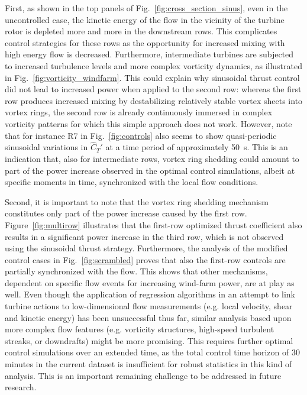 \documentclass[wes, manuscript]{copernicus}
\begin{document}
First, as shown in the top panels of Fig.~\ref{fig:cross_section_sinus}, even in the uncontrolled case, the kinetic energy of the flow in the vicinity of the turbine rotor is depleted more and more in the downstream rows. This complicates control strategies for these rows as the opportunity for increased mixing with high energy flow is decreased. Furthermore, intermediate turbines are subjected to increased turbulence levels and more complex vorticity dynamics, as illustrated in Fig.~\ref{fig:vorticity_windfarm}. This could explain why sinusoidal thrust control did not lead to increased power when applied to the second row: whereas the first row produces increased mixing by destabilizing relatively stable vortex sheets into vortex rings, the second row is already continuously immersed in complex vorticity patterns for which this simple approach does not work. 
However, note that for instance R7 in Fig.~\ref{fig:controls} also seems to show quasi-periodic sinusoidal variations in $\widehat{C}_{T}'$ at a time period of approximately 50~s. This is an indication that, also for intermediate rows, vortex ring shedding could amount to part of the power increase observed in the optimal control simulations, albeit at specific moments in time, synchronized with the local flow conditions.

Second, it is important to note that the vortex ring shedding mechanism constitutes only part of the power increase caused by the first row. Figure~\ref{fig:multirow} illustrates that the first-row optimized thrust coefficient also results in a significant power increase in the third row, which is not observed using the sinusoidal thrust strategy. Furthermore, the analysis of the modified control cases in Fig.~\ref{fig:scrambled} proves that also the first-row controls are partially synchronized with the flow. This shows that other mechanisms, dependent on specific flow events for increasing wind-farm power, are at play as well. Even though the application of regression algorithms in an attempt to link turbine actions to low-dimensional flow measurements (e.g. local velocity, shear and kinetic energy) has been unsuccessful thus far, similar analysis based upon more complex flow features (e.g. vorticity structures, high-speed turbulent streaks, or downdrafts) might be more promising. This requires further optimal control simulations over an extended time, as the total control time horizon of 30 minutes in the current dataset is insufficient for robust statistics in this kind of analysis. This is an important remaining challenge to be addressed in future research. 
\end{document}
